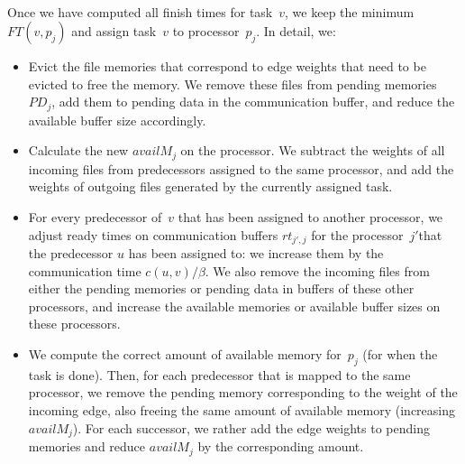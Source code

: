 \documentclass[conference]{IEEEtran}
\begin{document}
    \medskip
    \\
    Once we have computed all finish times for task~$v$,
    we keep the minimum $FT(v,p_j)$ and assign task~$v$
    to processor~$p_j$.
    In detail, we:
    \begin{itemize}
        \item  Evict the file memories that correspond to edge weights that need to be evicted to free the memory.
        We remove these files from pending memories
        $PD_j$, add them to pending data in the communication buffer, and reduce the available buffer size accordingly.
        \item    Calculate the new $availM_j$ on the processor.
        We subtract the weights of all incoming files from predecessors assigned to the same processor,
        and add the weights of outgoing files generated by the currently assigned task.
        \item  For every predecessor of~$v$ that has been assigned to another processor, we adjust ready times on
        communication buffers $rt_{j', j}$ for the processor~$j'$that the predecessor $u$ has been assigned to: we increase them by the
        communication time $c( u,v) / \beta$.
        We also remove the incoming files from either the pending memories or pending data in buffers of these other
        processors, and increase the available memories or available buffer sizes on these processors.
        \item We compute the correct amount of available memory for~$p_j$ (for when the task is done).
        Then, for each predecessor that is mapped to the same processor, 
        we remove the pending memory corresponding to the weight of
        the incoming edge, also freeing the same amount of available memory (increasing $availM_j$).
        For each successor, we rather add the edge weights to pending memories and reduce $availM_j$ 
        by the corresponding amount.
    \end{itemize}
\end{document}
